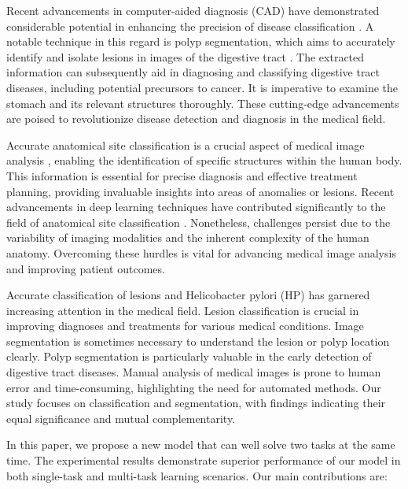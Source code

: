 \documentclass{article}
\begin{document}
Recent advancements in computer-aided diagnosis (CAD) have demonstrated considerable potential in enhancing the precision of disease classification \cite{Li2018}. A notable technique in this regard is polyp segmentation, which aims to accurately identify and isolate lesions in images of the digestive tract \cite{Wong2017}. The extracted information can subsequently aid in diagnosing and classifying digestive tract diseases, including potential precursors to cancer. It is imperative to examine the stomach and its relevant structures thoroughly. These cutting-edge advancements are poised to revolutionize disease detection and diagnosis in the medical field.

Accurate anatomical site classification is a crucial aspect of medical image analysis \cite{Girshick2017, Kooi2017, He2017}, enabling the identification of specific structures within the human body. This information is essential for precise diagnosis and effective treatment planning, providing invaluable insights into areas of anomalies or lesions. Recent advancements in deep learning techniques have contributed significantly to the field of anatomical site classification \cite{Girshick2017, Kooi2017, He2017}. Nonetheless, challenges persist due to the variability of imaging modalities and the inherent complexity of the human anatomy. Overcoming these hurdles is vital for advancing medical image analysis and improving patient outcomes.

Accurate classification of lesions and Helicobacter pylori (HP) has garnered increasing attention in the medical field. Lesion classification is crucial in improving diagnoses and treatments for various medical conditions. Image segmentation is sometimes necessary to understand the lesion or polyp location clearly. Polyp segmentation is particularly valuable in the early detection of digestive tract diseases. Manual analysis of medical images is prone to human error and time-consuming, highlighting the need for automated methods. Our study focuses on classification and segmentation, with findings indicating their equal significance and mutual complementarity.

In this paper, we propose a new model that can well solve two tasks at the same time. The experimental results demonstrate superior performance of our model in both single-task and multi-task learning scenarios.
Our main contributions are:
\end{document}
